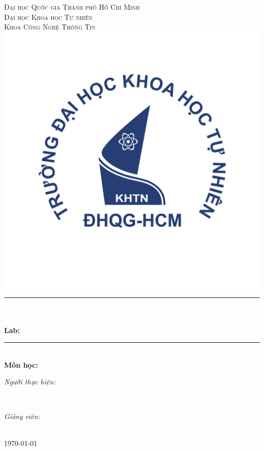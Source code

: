 \begin{titlepage}
	\newcommand{\HRule}{\rule{\linewidth}{0.5mm}}
	\centering
	
	\textsc{\Large Đại học Quốc gia Thành phố Hồ Chí Minh}\\[0.5cm]
	\textsc{\Large Đại học Khoa học Tự nhiên}\\[0.5cm]
	\textsc{\large Khoa Công Nghệ Thông Tin}\\[0.5cm]
	
	\includegraphics[scale=0.3]{Images/hcmus-logo.png}\\[0cm] 
	
	\HRule \\[0.4cm]
	{ 
		\huge{\bfseries{\reporttitle}}\\[0.5cm]
		\large{\bfseries{Lab: \reportname}}
	}\\[0.4cm]
	\HRule \\[0.5cm]
	
	\textbf{\large Môn học: \coursename}\\[0.5cm]
	
	\begin{minipage}[t]{0.5\textwidth}
		\begin{flushleft} \large
			\emph{Người thực hiện:}\\
			\studentname
		\end{flushleft}
	\end{minipage}
	~
	\begin{minipage}[t]{0.4\textwidth}
		\begin{flushright} \large
			\emph{Giảng viên:} \\
			\teachername
		\end{flushright}
	\end{minipage}\\[2cm]
	
	{\large \today}\\[2cm]
	\vfill
\end{titlepage}
